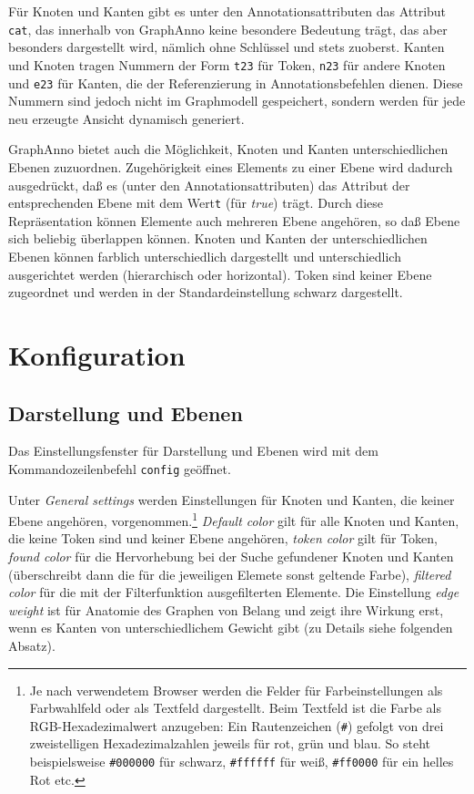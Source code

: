 \documentclass[12pt]{scrartcl}
\begin{document}
Für Knoten und Kanten gibt es unter den Annotationsattributen das Attribut \texttt{cat}, das innerhalb von GraphAnno keine besondere Bedeutung trägt, das aber besonders dargestellt wird, nämlich ohne Schlüssel und stets zuoberst.
Kanten und Knoten tragen Nummern der Form \texttt{t23} für Token, \texttt{n23} für andere Knoten und \texttt{e23} für Kanten, die der Referenzierung in Annotationsbefehlen dienen.
Diese Nummern sind jedoch nicht im Graphmodell gespeichert, sondern werden für jede neu erzeugte Ansicht dynamisch generiert.

GraphAnno bietet auch die Möglichkeit, Knoten und Kanten unterschiedlichen Ebenen zuzuordnen. Zugehörigkeit eines Elements zu einer Ebene wird dadurch ausgedrückt, daß es (unter den Annotationsattributen) das Attribut der entsprechenden Ebene mit dem Wert\texttt{t} (für \textit{true}) trägt. Durch diese Repräsentation können Elemente auch mehreren Ebene angehören, so daß Ebene sich beliebig überlappen können. Knoten und Kanten der unterschiedlichen Ebenen können farblich unterschiedlich dargestellt und unterschiedlich ausgerichtet werden (hierarchisch oder horizontal). Token sind keiner Ebene zugeordnet und werden in der Standardeinstellung schwarz dargestellt.



\section{Konfiguration}\label{konfiguration}

\subsection{Darstellung und Ebenen}\label{ebenenkonfiguration}

Das Einstellungsfenster für Darstellung und Ebenen wird mit dem Kommandozeilenbefehl \texttt{config} geöffnet.

Unter \textit{General settings} werden Einstellungen für Knoten und Kanten, die keiner Ebene angehören, vorgenommen.\footnote{Je nach verwendetem Browser werden die Felder für Farbeinstellungen als Farbwahlfeld oder als Textfeld dargestellt. Beim Textfeld ist die Farbe als RGB-Hexadezimalwert anzugeben: Ein Rautenzeichen (\texttt{\#}) gefolgt von drei zweistelligen Hexadezimalzahlen jeweils für rot, grün und blau. So steht beispielsweise \texttt{\#000000} für schwarz, \texttt{\#ffffff} für weiß, \texttt{\#ff0000} für ein helles Rot etc.} \textit{Default color} gilt für alle Knoten und Kanten, die keine Token sind und keiner Ebene angehören, \textit{token color} gilt für Token, \textit{found color} für die Hervorhebung bei der Suche gefundener Knoten und Kanten (überschreibt dann die für die jeweiligen Elemete sonst geltende Farbe), \textit{filtered color} für die mit der Filterfunktion ausgefilterten Elemente. Die Einstellung \textit{edge weight} ist für Anatomie des Graphen von Belang und zeigt ihre Wirkung erst, wenn es Kanten von unterschiedlichem Gewicht gibt (zu Details siehe folgenden Absatz).
\end{document}
